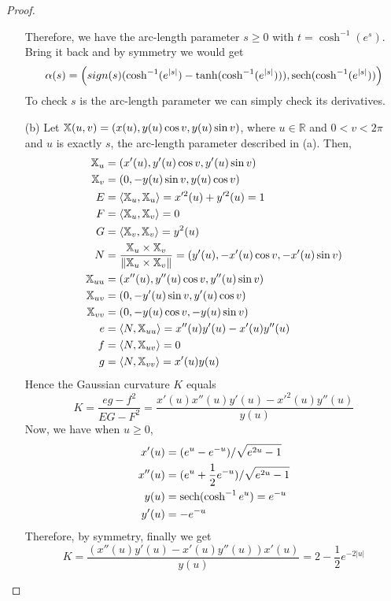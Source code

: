 \documentclass[10pt,a4paper]{article}
\begin{document}
\begin{proof}
\begin{enumerate}
Therefore, we have the arc-length parameter $s\ge 0$ with $t = \cosh^{-1}(e^s)$. Bring it back and by symmetry we would get \[
\alpha(s) = \left(sign(s)(\cosh^{-1}(e^{|s|})-\tanh(\cosh^{-1}(e^{|s|}))), \mbox{sech}(\cosh^{-1}(e^{|s|}))\right)
\]
To check $s$ is the arc-length parameter we can simply check its derivatives.
\item[(b)] Let $\mathbb{X}(u, v) = (x(u), y(u)\cos v, y(u)\sin v)$, where $u\in\mathbb{R}$ and $0<v<2\pi$ and $u$ is exactly $s$, the arc-length parameter described in (a). Then,
\begin{align*}
\mathbb{X}_u &= \left(x'(u), y'(u)\cos v, y'(u)\sin v\right)\\
\mathbb{X}_v &= \left(0, -y(u)\sin v, y(u)\cos v\right)\\
E &= \left\langle \mathbb{X}_u, \mathbb{X}_u\right\rangle = x'^2(u)+y'^2(u)=1\\
F &= \left\langle \mathbb{X}_u, \mathbb{X}_v\right\rangle = 0\\
G &= \left\langle \mathbb{X}_v, \mathbb{X}_v\right\rangle = y^2(u)\\
N &= \frac{\mathbb{X}_u\times\mathbb{X}_v}{\|\mathbb{X}_u\times\mathbb{X}_v\|} = \left(y'(u), -x'(u)\cos v, -x'(u)\sin v\right)\\
\mathbb{X}_{uu} &= \left(x''(u), y''(u)\cos v, y''(u)\sin v\right)\\
\mathbb{X}_{uv} &= \left(0, -y'(u)\sin v, y'(u)\cos v\right)\\
\mathbb{X}_{vv} &= \left(0, -y(u)\cos v, -y(u)\sin v\right)\\
e &= \left\langle N, \mathbb{X}_{uu}\right\rangle = x''(u)y'(u)-x'(u)y''(u)\\
f &= \left\langle N, \mathbb{X}_{uv}\right\rangle = 0\\
g &= \left\langle N, \mathbb{X}_{vv}\right\rangle = x'(u)y(u)
\end{align*}
Hence the Gaussian curvature $K$ equals
\[
K=\frac{eg-f^2}{EG-F^2} = \frac{x'(u)x''(u)y'(u)-x'^2(u)y''(u)}{y(u)}
\]
Now, we have when $u\ge 0$,
\begin{align*}
x'(u)&=(e^u-e^{-u}) / \sqrt{e^{2u}-1}\\
x''(u)&=(e^u+\frac12 e^{-u}) / \sqrt{e^{2u}-1}\\
y(u)&=\mbox{sech}(\cosh^{-1}e^u) = e^{-u}\\
y'(u)&=-e^{-u}
\end{align*}
Therefore, by symmetry, finally we get
\[
K=\frac{(x''(u)y'(u)-x'(u)y''(u))x'(u)}{y(u)} = 2-\frac12e^{-2|u|}
\]
\end{enumerate}
\end{proof}
\end{document}
